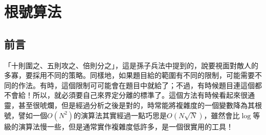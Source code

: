 \chapter{根號算法}
\section{前言}
	「十則圍之、五則攻之、倍則分之」，這是孫子兵法中提到的，說要視面對敵人的多寡，要採用不同的策略。同樣地，如果題目給的範圍有不同的限制，可能需要不同的作法。有時，這個限制可可能會在題目中就給了；不過，有時候題目連這個都不會給！所以，就必須要自己來界定分離的標準了。這個方法有時候看起來很通靈，甚至很唬爛，但是經過分析之後是對的，時常能將複雜度的一個變數降為其根號，譬如一個$O(N^2)$的演算法其實經過一點巧思是$O(N\sqrt{N})$，雖然會比$\log$等級的演算法慢一些，但是通常實作複雜度低許多，是一個很實用的工具！